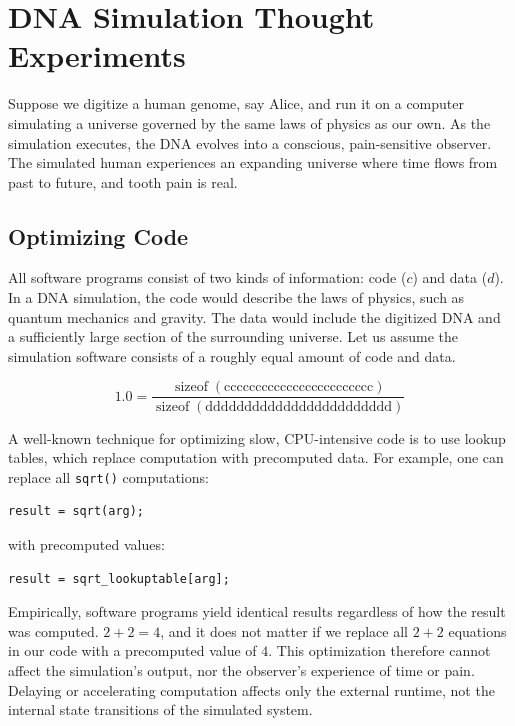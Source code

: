 \section{DNA Simulation Thought Experiments}

Suppose we digitize a human genome, say Alice, and run it on a computer simulating a universe governed by the same laws of physics as our own.
As the simulation executes, the DNA evolves into a conscious, pain-sensitive observer.
The simulated human experiences an expanding universe where time flows from past to future, and tooth pain is real.


\subsection*{Optimizing Code}

All software programs consist of two kinds of information: code ($c$) and data ($d$).
In a DNA simulation, the code would describe the laws of physics, such as quantum mechanics and gravity.
The data would include the digitized DNA and a sufficiently large section of the surrounding universe.
Let us assume the simulation software consists of a roughly equal amount of code and data.

\[
1.0 = \frac{\operatorname{sizeof}(\text{cccccccccccccccccccccccc})}
          {\operatorname{sizeof}(\text{dddddddddddddddddddddddd})}
\]

A well-known technique for optimizing slow, CPU-intensive code is to use lookup tables, which replace computation with precomputed data.
For example, one can replace all \texttt{sqrt()} computations:

\begin{verbatim}
result = sqrt(arg);
\end{verbatim}

with precomputed values:

\begin{verbatim}
result = sqrt_lookuptable[arg];
\end{verbatim}

Empirically, software programs yield identical results regardless of how the result was computed. $2+2=4$, and it does not matter if we replace all $2+2$ equations in our code with a precomputed value of $4$.
This optimization therefore cannot affect the simulation's output, nor the observer's experience of time or pain.
Delaying or accelerating computation affects only the external runtime, not the internal state transitions of the simulated system.

